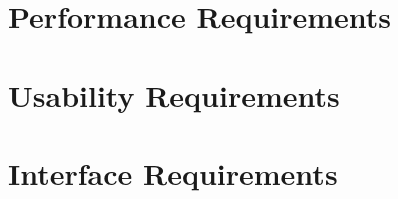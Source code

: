 \section{Performance Requirements}



\section{Usability Requirements}



\section{Interface Requirements}



